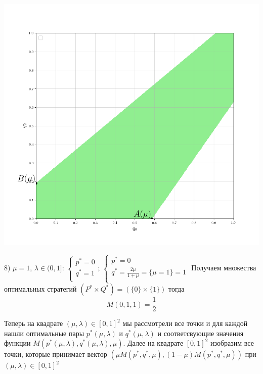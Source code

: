 \documentclass[letterpaper,12pt, reqno]{article}
\begin{document}
\begin{flushleft}
\begin{center}
\includegraphics[scale=0.5]{graf_3_8}
\end{center}
8) $\mu = 1$, $\lambda \in (0, 1] $: 
$\begin{cases}
p^{*}=0 \\
q^{*}=1 \\
\end{cases}$;
$\begin{cases}
p^{*}=0 \\
q^{*}=\frac{2\mu}{1+\mu}=\{\mu=1\}=1 \\
\end{cases}$
\hfill \break
Получаем множества оптимальных стратегий 
$(P^{*} \times Q^{*}) =(\{0\} \times \{1\})$ тогда
$$M(0, 1, 1)=\frac{1}{2}$$
\vspace{40mm}

Теперь на квадрате $(\mu,\lambda)\in[0, 1]^{2}$ мы рассмотрели все точки и для каждой нашли оптимальные пары $p^{*}(\mu, \lambda)$
и $q^{*}(\mu, \lambda)$ и соответсвующие значения функции $M(p^{*}(\mu, \lambda),q^{*}(\mu, \lambda),\mu)$. Далее на квадрате
$[0, 1]^{2}$ изобразим все точки, которые принимает вектор $(\mu M(p^{*},q^{*},\mu), (1-\mu) M(p^{*},q^{*},\mu))$ при
$(\mu, \lambda)\in[0, 1]^{2}$


\end{flushleft}
\end{document}
